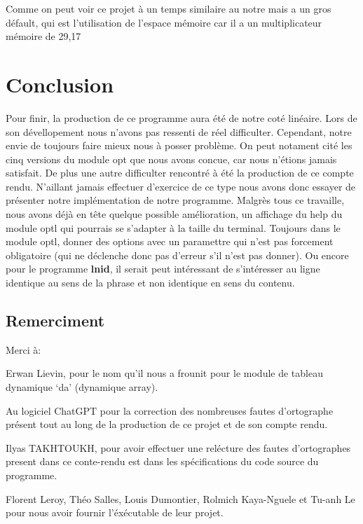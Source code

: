 \documentclass[12pt]{article}
\begin{document}
\begin{enumerate}
        Comme on peut voir ce projet à un temps similaire au notre mais a un
        gros défault, qui est l'utilisation de l'espace mémoire car il a un
        multiplicateur mémoire de 29,17
    \end{enumerate}

    \newpage

    \section{Conclusion}

    Pour finir, la production de ce programme aura été de notre coté linéaire. 
    Lors de son dévellopement nous n'avons pas ressenti de réel difficulter. 
    Cependant, notre envie de toujours faire mieux nous à posser problème. On 
    peut notament cité les cinq versions du module opt que nous avons concue, 
    car nous n'étions jamais satisfait. De plus une autre difficulter rencontré
    à été la production de ce compte rendu. N'aillant jamais effectuer 
    d'exercice de ce type nous avons donc essayer de présenter notre 
    implémentation de notre programme. Malgrès tous ce travaille, nous avons 
    déjà en tête quelque possible amélioration, un affichage du help du module 
    optl qui pourrais se s'adapter à la taille du terminal. Toujours dans le 
    module optl, donner des options avec un paramettre qui n'est pas forcement 
    obligatoire (qui ne déclenche donc pas d'erreur s'il n'est pas donner). Ou 
    encore pour le programme \textbf{lnid}, il serait peut intéressant de 
    s'intéresser au ligne identique au sens de la phrase et non identique en 
    sens du contenu.

    \subsection{Remerciment}

    Merci à: 

    Erwan Lievin, pour le nom qu'il nous a frounit pour le module de tableau 
    dynamique `da' (dynamique array).

    Au logiciel ChatGPT pour la correction des nombreuses fautes d'ortographe 
    présent tout au long de la production de ce projet et de son compte rendu.

    Ilyas TAKHTOUKH, pour avoir effectuer une relécture des fautes 
    d'ortographes present dans ce conte-rendu est dans les spécifications du 
    code source du programme. 

    Florent Leroy, Théo Salles, Louis Dumontier, Rolmich Kaya-Nguele et Tu-anh 
    Le pour nous avoir fournir l'éxécutable de leur projet.  
\end{document}
